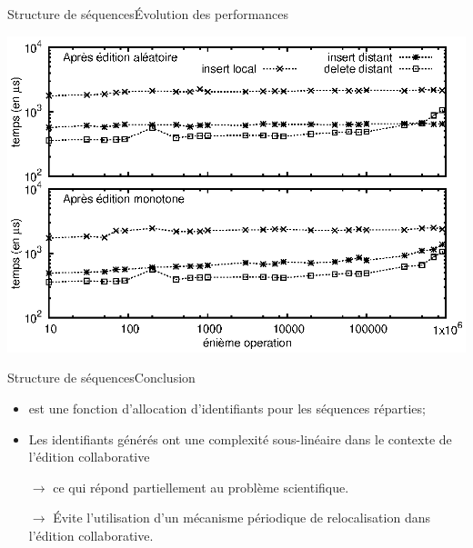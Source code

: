 \begin{frame}{Structure de séquences}{Évolution des performances}

  \begin{center}
    \includegraphics[width=\textwidth]{img/replication/time.eps}
  \end{center}

\end{frame}


\begin{frame}{Structure de séquences}{Conclusion}

  \begin{itemize}
  \item \LSEQ est une fonction d'allocation d'identifiants pour les séquences
    réparties;
  \item Les identifiants générés ont une complexité sous-linéaire dans le contexte
    de l'édition collaborative
  \item [$\rightarrow$] ce qui répond partiellement au problème scientifique.
  \item [$\rightarrow$] Évite l'utilisation d'un mécanisme périodique de
    relocalisation dans l'édition collaborative.
  \end{itemize}


  

\end{frame}



